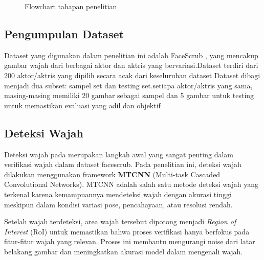 \documentclass[a4paper, 11pt]{article}
\begin{document}
\begin{figure}[h]
    \centering
    \caption{Flowchart tahapan penelitian}
    \label{fig:flowchart}
\end{figure}



\subsection{Pengumpulan Dataset}


Dataset yang digunakan dalam penelitian ini adalah FaceScrub , yang mencakup gambar wajah dari berbagai aktor dan aktris yang bervariasi.Dataset terdiri dari 200 aktor/aktris yang dipilih secara acak dari keseluruhan dataset 
Dataset dibagi menjadi dua subset: sampel set dan testing set.setiapa aktor/aktris yang sama, masing-masing memiliki 20 gambar sebagai sampel dan 5 gambar untuk testing untuk memastikan evaluasi yang adil dan objektif

\subsection{Deteksi Wajah}

Deteksi wajah pada merupakan langkah awal yang sangat penting dalam  verifikasi wajah dalam dataset facescrub. Pada penelitian ini, deteksi wajah dilakukan menggunakan framework \textbf{MTCNN} (Multi-task Cascaded Convolutional Networks). MTCNN adalah salah satu metode deteksi wajah yang terkenal karena kemampuannya mendeteksi wajah dengan akurasi tinggi meskipun dalam kondisi variasi pose, pencahayaan, atau resolusi rendah.

Setelah wajah terdeteksi, area wajah tersebut dipotong menjadi \textit{Region of Interest} (RoI) untuk memastikan bahwa proses verifikasi hanya berfokus pada fitur-fitur wajah yang relevan. Proses ini membantu mengurangi noise dari latar belakang gambar dan meningkatkan akurasi model dalam mengenali wajah.
\end{document}
